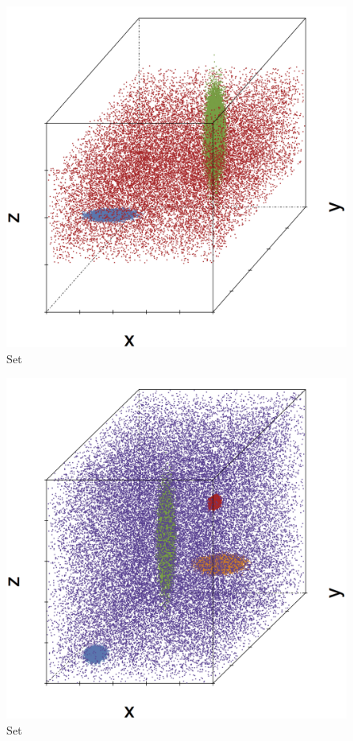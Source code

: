 \begin{subfigure}{0.3\textwidth}
	\centering
	\includegraphics[width=\textwidth]{3/img/datasetplot_baakman_2_60000.png}
	\caption{Set \baakmanTwo}
	\label{fig:3:simulated:datasets:baakman2}
\end{subfigure}	
\begin{subfigure}{0.3\textwidth}
	\centering
	\includegraphics[width=\textwidth]{3/img/datasetplot_baakman_3_120000.png}
	\caption{Set \baakmanThree}
	\label{fig:3:simulated:datasets:baakman3}
\end{subfigure}
